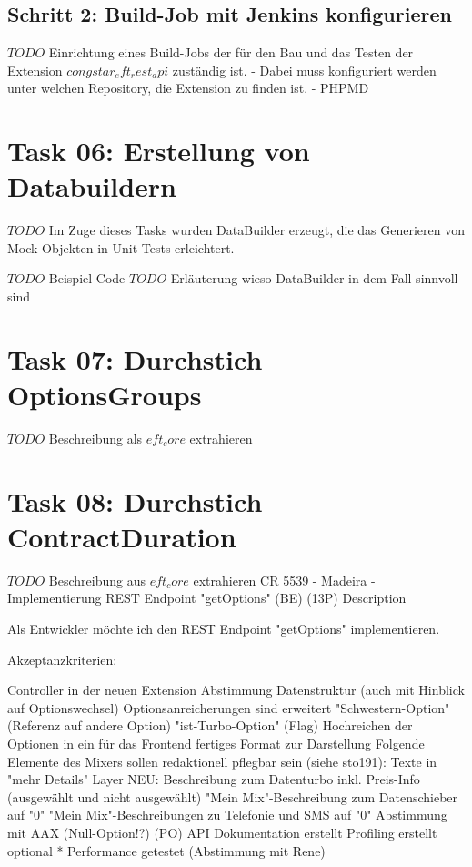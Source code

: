 \documentclass[11pt,a4paper]{article} %
\begin{document}
\subsection{Schritt 2: Build-Job mit Jenkins konfigurieren}

$TODO$ Einrichtung eines Build-Jobs der für den Bau und das Testen
der Extension $congstar_eft_rest_api$ zuständig ist.
- Dabei muss konfiguriert werden unter welchen Repository, die Extension zu finden ist.
- PHPMD

\section{Task 06: Erstellung von Databuildern}

$TODO$ Im Zuge dieses Tasks wurden DataBuilder erzeugt, die das Generieren von Mock-Objekten in Unit-Tests erleichtert.

$TODO$ Beispiel-Code 
$TODO$ Erläuterung wieso DataBuilder in dem Fall sinnvoll sind

\section{Task 07: Durchstich OptionsGroups}

$TODO$ Beschreibung als $eft_core$ extrahieren

\section{Task 08: Durchstich ContractDuration}

$TODO$ Beschreibung aus $eft_core$ extrahieren
CR 5539 - Madeira - Implementierung REST Endpoint "getOptions" (BE) (13P)
Description


Als Entwickler möchte ich den REST Endpoint "getOptions" implementieren.

Akzeptanzkriterien:

Controller in der neuen Extension
Abstimmung Datenstruktur (auch mit Hinblick auf Optionswechsel)
Optionsanreicherungen sind erweitert
"Schwestern-Option" (Referenz auf andere Option)
"ist-Turbo-Option" (Flag)
Hochreichen der Optionen in ein für das Frontend fertiges Format zur Darstellung
Folgende Elemente des Mixers sollen redaktionell pflegbar sein (siehe sto191):
Texte in "mehr Details" Layer
NEU: Beschreibung zum Datenturbo inkl. Preis-Info (ausgewählt und nicht ausgewählt)
"Mein Mix"-Beschreibung zum Datenschieber auf "0"
"Mein Mix"-Beschreibungen zu Telefonie und SMS auf "0"
Abstimmung mit AAX (Null-Option!?) (PO)
API Dokumentation erstellt
Profiling erstellt
optional
* Performance getestet (Abstimmung mit Rene)
\end{document}
